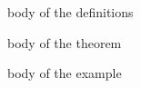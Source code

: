 \begin{Definition}\label{def:definition}
body of the definitions
\end{Definition}

\begin{Theorem}\label{t:theorem}
body of the theorem
\end{Theorem}

\begin{Example}\label{ex:example}
body of the example
\end{Example}



